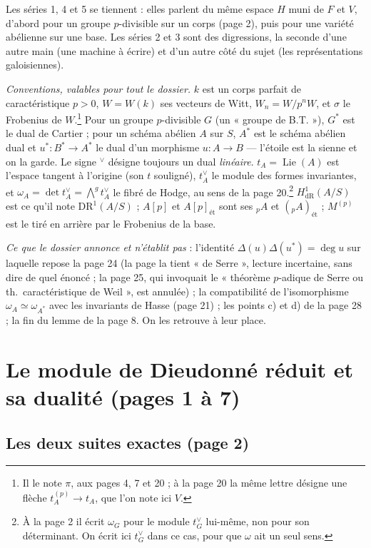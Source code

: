 \documentclass[11pt,a4paper]{article}
\begin{document}
Les séries 1, 4 et 5 se tiennent : elles parlent du même espace $H$ muni de
$F$ et $V$, d'abord pour un groupe $p$-divisible sur un corps (page 2), puis
pour une variété abélienne sur une base. Les séries 2 et 3 sont des
digressions, la seconde d'une autre main (une machine à écrire) et d'un
autre côté du sujet (les représentations galoisiennes).

\emph{Conventions, valables pour tout le dossier.} $k$ est un corps parfait de
caractéristique $p > 0$, $W = W(k)$ ses vecteurs de Witt, $W_n = W/p^n W$, et
$\sigma$ le Frobenius de $W$.\footnote{Il le note $\pi$, aux pages 4, 7 et
20 ; à la page 20 la même lettre désigne une flèche $t_A^{(p)} \to t_A$, que
l'on note ici $V$.} Pour un groupe $p$-divisible $G$ (un « groupe de B.T. »),
$G^*$ est le dual de Cartier ; pour un schéma abélien $A$ sur $S$, $A^*$ est le
schéma abélien dual et $u^* : B^* \to A^*$ le dual d'un morphisme $u : A \to
B$ --- l'étoile est la sienne et on la garde. Le signe ${}^\vee$ désigne
toujours un dual \emph{linéaire}. $t_A = \operatorname{Lie}(A)$ est l'espace
tangent à l'origine (son $t$ souligné), $t_A^\vee$ le module des formes
invariantes, et $\omega_A = \det t_A^\vee = \bigwedge^g t_A^\vee$ le
fibré de Hodge, au sens de la page 20.\footnote{À la page 2 il écrit
$\omega_G$ pour le module $t_G^\vee$ lui-même, non pour son déterminant. On
écrit ici $t_G^\vee$ dans ce cas, pour que $\omega$ ait un seul sens.}
$H^1_{\mathrm{dR}}(A/S)$ est ce qu'il note $\mathrm{DR}^1(A/S)$ ; $A[p]$ et
$A[p]_{\text{ét}}$ sont ses ${}_pA$ et $({}_pA)_{\text{ét}}$ ; $M^{(p)}$ est le
tiré en arrière par le Frobenius de la base.

\emph{Ce que le dossier annonce et n'établit pas} : l'identité $\Delta(u)
\Delta(u^*) = \deg u$ sur laquelle repose la page 24 (la page la tient « de
Serre », lecture incertaine, sans dire de quel énoncé ; la page 25, qui
invoquait le « théorème $p$-adique de Serre ou th.\ caractéristique de Weil »,
est annulée) ; la
compatibilité de l'isomorphisme $\omega_A \simeq \omega_{A^*}$ avec les
invariants de Hasse (page 21) ; les points c) et d) de la page 28 ; la
fin du lemme de la page 8. On les retrouve à leur place.

\section*{Le module de Dieudonné réduit et sa dualité (pages 1 à 7)}

\subsection*{Les deux suites exactes (page 2)}
\end{document}

